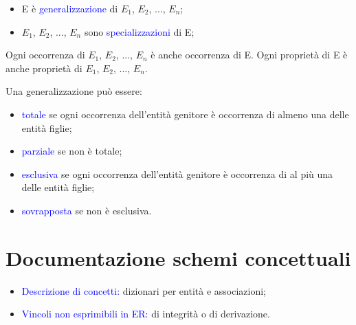 \begin{itemize}
    \item E è \textcolor{blue}{generalizzazione} di $E_1$, $E_2$, ..., $E_n$;
    \item $E_1$, $E_2$, ..., $E_n$ sono \textcolor{blue}{specializzazioni} di E;
\end{itemize}

Ogni occorrenza di $E_1$, $E_2$, ..., $E_n$ è anche occorrenza di E. Ogni proprietà di E è anche proprietà di $E_1$, $E_2$, ..., $E_n$.

Una generalizzazione può essere:
\begin{itemize}
    \item \textcolor{blue}{totale} se ogni occorrenza dell'entità genitore è occorrenza di almeno una delle entità figlie;
    \item \textcolor{blue}{parziale} se non è totale;
    \item \textcolor{blue}{esclusiva} se ogni occorrenza dell'entità genitore è occorrenza di al più una delle entità figlie;
    \item \textcolor{blue}{sovrapposta} se non è esclusiva.
\end{itemize}

\section{Documentazione schemi concettuali}

\begin{itemize}
    \item \textcolor{blue}{Descrizione di concetti:} dizionari per entità e associazioni;
    \item \textcolor{blue}{Vincoli non esprimibili in ER:} di integrità o di derivazione.
\end{itemize}